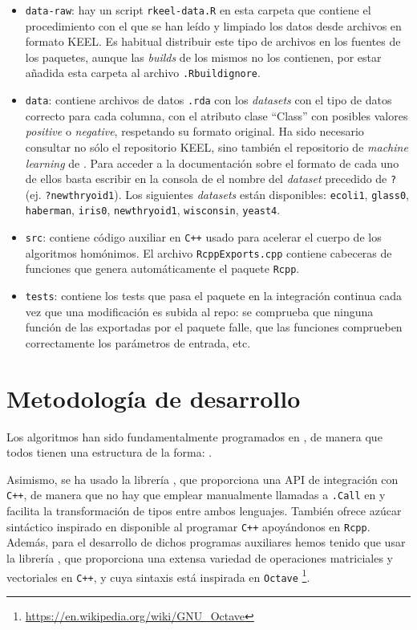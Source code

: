 \begin{itemize}
 \item \texttt{data-raw}: hay un script \texttt{rkeel-data.R} en esta carpeta que contiene el procedimiento con el que se han
 leído y limpiado los datos desde archivos en formato KEEL. Es habitual distribuir este tipo de archivos en los fuentes de
 los paquetes, aunque las \textit{builds} de los mismos no los contienen, por estar añadida esta carpeta al archivo \texttt{.Rbuildignore}.
 \item \texttt{data}: contiene archivos de datos \texttt{.rda} con los \textit{datasets} con el tipo de datos 
 correcto para cada columna, con el atributo clase ``Class'' con posibles valores \textit{positive} o \textit{negative}, 
 respetando su formato original. Ha sido necesario consultar no sólo el repositorio KEEL, sino también el repositorio 
 de \textit{machine learning} de . Para acceder a la documentación sobre el formato de cada uno de ellos 
 basta escribir en la consola de \R el nombre del \textit{dataset} precedido de \texttt{?} (ej. \texttt{?newthryoid1}). Los
 siguientes \textit{datasets} están disponibles: \texttt{ecoli1}, \texttt{glass0}, \texttt{haberman}, \texttt{iris0},
 \texttt{newthryoid1}, \texttt{wisconsin}, \texttt{yeast4}.
 \item \texttt{src}: contiene código auxiliar en \texttt{C++} usado para acelerar el cuerpo de los algoritmos homónimos. El
 archivo \texttt{RcppExports.cpp} contiene cabeceras de funciones que genera automáticamente el paquete \texttt{Rcpp}.
 \item \texttt{tests}: contiene los tests que pasa el paquete en la integración continua cada vez que una modificación 
 es subida al repo: se comprueba que ninguna función de las exportadas por el paquete falle, que las funciones comprueben
 correctamente los parámetros de entrada, etc.
\end{itemize}


\section{Metodología de desarrollo}
Los algoritmos han sido fundamentalmente programados en \R, de manera que todos tienen una estructura de la forma:
.

Asimismo, se ha usado la librería , que proporciona una API de integración con \texttt{C++}, de manera que
no hay que emplear manualmente llamadas a \texttt{.Call} en \R y facilita la transformación de tipos entre ambos lenguajes. También 
ofrece azúcar sintáctico inspirado en \R disponible al programar \texttt{C++} apoyándonos en \texttt{Rcpp}. Además, para el desarrollo
de dichos programas auxiliares hemos tenido que usar la librería , que proporciona una extensa variedad 
de operaciones matriciales y vectoriales en \texttt{C++}, y cuya sintaxis está inspirada en \texttt{Octave}
\footnote{\url{https://en.wikipedia.org/wiki/GNU_Octave}}.

